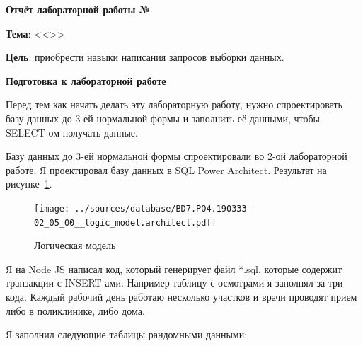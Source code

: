 \begin{center}
  \textbf{Отчёт лабораторной работы №\envReportLabNumber}
\end{center}

\textbf{Тема}:
<<\envReportTitle>>

\textbf{Цель}: приобрести навыки написания запросов выборки данных.


\begin{center}
  \textbf{Подготовка к лабораторной работе}
\end{center}

Перед тем как начать делать эту лабораторную работу, нужно спроектировать базу данных до 3-ей нормальной формы
и заполнить её данными, чтобы SELECT-ом получать данные.

Базу данных до 3-ей нормальной формы спроектировали во 2-ой лабораторной работе.
Я проектировал базу данных в SQL Power Architect. Результат на рисунке~\ref{fig:database}.

\begin{figure}[!h]
  \centering

  \texttt{[image: ../sources/database/BD7.PO4.190333-02\_05\_00\_\_logic\_model.architect.pdf]}

  \caption{Логическая модель}

  \label{fig:database}
\end{figure}

Я на Node JS написал код, который генерирует файл *.sql, которые содержит транзакции с INSERT-ами.
Например таблицу с осмотрами я заполнял за три кода.
Каждый рабочий день работаю несколько участков и врачи проводят прием либо в поликлинике, либо дома.

Я заполнил следующие таблицы рандомными данными:

